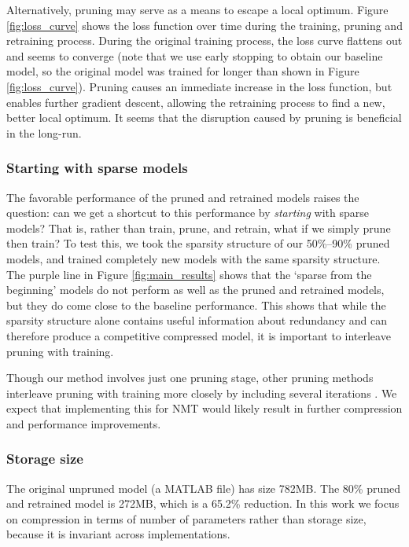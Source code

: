 Alternatively, pruning may serve as a means to escape a local optimum. 
Figure \ref{fig:loss_curve} shows the loss function over time during the training, pruning and retraining process.
During the original training process, the loss curve flattens out and seems to converge (note that we use early stopping to obtain our baseline model, so the original model was trained for longer than shown in Figure \ref{fig:loss_curve}).
Pruning causes an immediate increase in the loss function, but enables further gradient descent, allowing the retraining process to find a new, better local optimum.
It seems that the disruption caused by pruning is beneficial in the long-run.

\subsubsection{Starting with sparse models}
\label{subsec:sparse}
The favorable performance of the pruned and retrained models raises the question: can we get a shortcut to this performance by \emph{starting} with sparse models?
That is, rather than train, prune, and retrain, what if we simply prune then train?
To test this, we took the sparsity structure of our 50\%--90\% pruned models, and trained completely new models with the same sparsity structure.
The purple line in Figure \ref{fig:main_results} shows that the `sparse from the beginning' models do not perform as well as the pruned and retrained models, but they do come close to the baseline performance.
This shows that while the sparsity structure alone contains useful information about redundancy and can therefore produce a competitive compressed model, it is important to interleave pruning with training.

Though our method involves just one pruning stage, other pruning methods interleave pruning with training more closely by including several iterations \cite{collins2014memory,han2015learning}.
We expect that implementing this for NMT would likely result in further compression and performance improvements.



\subsubsection{Storage size}
The original unpruned model (a MATLAB file) has size 782MB.
The 80\% pruned and retrained model is 272MB, which is a 65.2\% reduction.
In this work we focus on compression in terms of number of parameters rather than storage size, because it is invariant across implementations.


